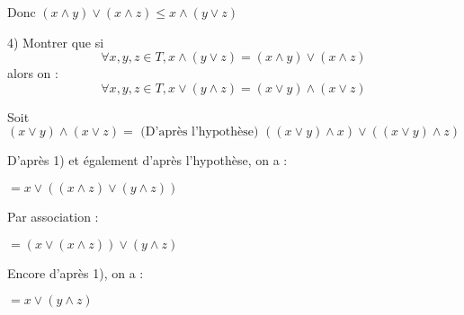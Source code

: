 \documentclass[a4paper,12pt]{article}
\begin{document}
Donc $(x \wedge y) \vee (x \wedge z) \leq x \wedge (y \vee z)$

4) Montrer que si 
$$\forall x, y, z \in T, x \wedge (y \vee z) = (x \wedge y) \vee (x \wedge z)$$
alors on :
$$\forall x, y, z \in T, x \vee (y \wedge z) = (x \vee y) \wedge (x \vee z)$$

Soit $(x \vee y) \wedge (x \vee z) = \text{ (D'après l'hypothèse) } ((x \vee y) \wedge x) \vee ((x \vee y) \wedge z)$

D'après 1) et également d'après l'hypothèse, on a :

$ = x \vee ((x \wedge z) \vee (y \wedge z))$

Par association :

$ = (x \vee (x \wedge z)) \vee (y \wedge z)$

Encore d'après 1), on a :

$ = x \vee (y \wedge z)$
\end{document}
